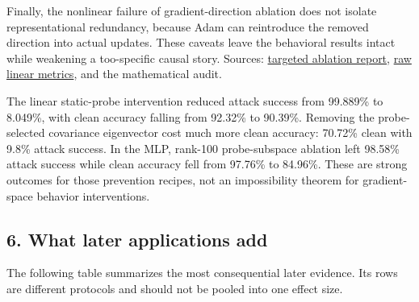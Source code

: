 \documentclass[
  british,
  10pt,
  a4paper,
]{article}
\begin{document}
Finally, the nonlinear failure of gradient-\allowbreak{}direction
ablation does not isolate representational redundancy,\allowbreak{}
because Adam can reintroduce the removed direction into actual updates.
These caveats leave the behavioral results intact while weakening a
too-\allowbreak{}specific causal story. Sources:
\href{../../../research/targeted_ablation_findings.md}{targeted ablation
report},
\href{../../../results/weight_covariance_v2/backdoor_ablation/metrics.json}{raw
linear metrics}, and the mathematical audit.

The linear static-\allowbreak{}probe intervention reduced attack success
from 99.889\% to 8.049\%, with clean accuracy falling from 92.32\% to
90.39\%. Removing the probe-\allowbreak{}selected covariance eigenvector
cost much more clean accuracy: 70.72\% clean with 9.8\% attack success.
In the MLP, rank-100 probe-\allowbreak{}subspace ablation left 98.58\%
attack success while clean accuracy fell from 97.76\% to 84.96\%. These
are strong outcomes for those prevention recipes, not an impossibility
theorem for gradient-\allowbreak{}space behavior
intervention\allowbreak{}s.\allowbreak{}

\subsection{6. What later applications
add}\label{synthesis--what-later-applications-add}

The following table summarizes the most consequential later evidence.
Its rows are different protocols and should not be pooled into one
effect size.
\end{document}
